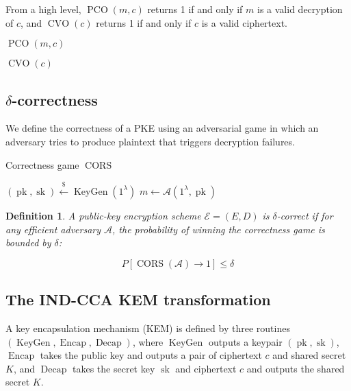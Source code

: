 \documentclass{article}
\newcommand{\leftsample}{\overset{{\scriptscriptstyle\$}}{\leftarrow}}
\newcommand{\keygen}{\operatorname{KeyGen}}
\newcommand{\pk}{\operatorname{pk}}
\newcommand{\sk}{\operatorname{sk}}
\newcommand{\pco}{\operatorname{PCO}}
\newcommand{\cvo}{\operatorname{CVO}}
\newcommand{\encap}{\operatorname{Encap}}
\newcommand{\decap}{\operatorname{Decap}}
\newcommand{\llbrack}{[\![}
\newcommand{\rrbrack}{]\!]}
\newtheorem{definition}{Definition}[section]
\begin{document}
From a high level, $\pco(m, c)$ returns 1 if and only if $m$ is a valid decryption of $c$, and $\cvo(c)$ returns 1 if and only if $c$ is a valid ciphertext.

\begin{multicols}{2}
    \begin{algorithm}[H]
        \caption{$\pco(m, c)$}
        \Return{
            $\llbrack D(\sk, c) = m \rrbrack$
        }
    \end{algorithm}

    \begin{algorithm}[H]
        \caption{$\cvo(c)$}
        \Return{
            $\llbrack D(\sk, c) \in \mathcal{M} \rrbrack$
        }
    \end{algorithm}
\end{multicols}

\subsection{$\delta$-correctness}
We define the correctness of a PKE using an adversarial game in which an adversary tries to produce plaintext that triggers decryption failures.

\begin{algorithm}[H]
    \caption{Correctness game $\operatorname{CORS}$}
    \SetAlgoLined
    $(\pk, \sk) \leftsample \keygen(1^\lambda)$\;
    $m \leftarrow \mathcal{A}(1^\lambda, \pk)$\;
    \Return{
        $\llbrack D(\sk, E(\pk, m)) \neq m \rrbrack$\;
    }
\end{algorithm}

\begin{definition}
    A public-key encryption scheme $\mathcal{E}=(E, D)$ is $\delta$-correct if for any efficient adversary $\mathcal{A}$, the probability of winning the correctness game is bounded by $\delta$:

    \begin{equation*}
        P[\operatorname{CORS}(\mathcal{A}) \rightarrow 1] \leq \delta
    \end{equation*}
\end{definition}

\subsection{The IND-CCA KEM transformation}
A key encapsulation mechanism (KEM) is defined by three routines $(\keygen, \encap, \decap)$, where $\keygen$ outputs a keypair $(\pk, \sk)$, $\encap$ takes the public key and outputs a pair of ciphertext $c$ and shared secret $K$, and $\decap$ takes the secret key $\sk$ and ciphertext $c$ and outputs the shared secret $K$.
\end{document}
